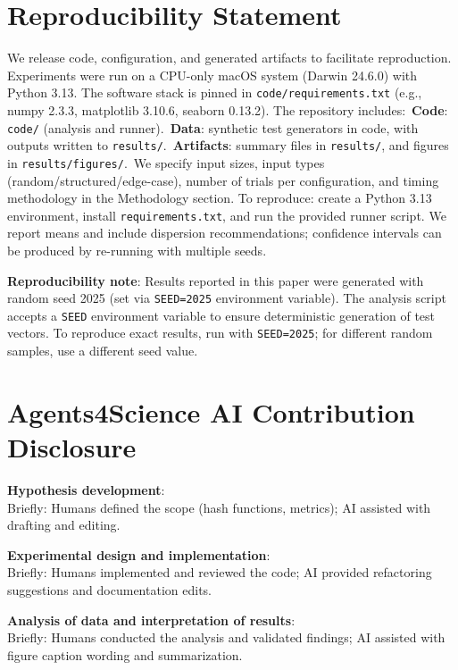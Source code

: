 \section*{Reproducibility Statement}
We release code, configuration, and generated artifacts to facilitate reproduction. Experiments were run on a CPU-only macOS system (Darwin 24.6.0) with Python 3.13. The software stack is pinned in \texttt{code/requirements.txt} (e.g., numpy 2.3.3, matplotlib 3.10.6, seaborn 0.13.2). The repository includes:\
\noindent\textbf{Code}: \texttt{code/} (analysis and runner).\
\noindent\textbf{Data}: synthetic test generators in code, with outputs written to \texttt{results/}.\
\noindent\textbf{Artifacts}: summary files in \texttt{results/}, and figures in \texttt{results/figures/}.\
We specify input sizes, input types (random/structured/edge-case), number of trials per configuration, and timing methodology in the Methodology section. To reproduce: create a Python 3.13 environment, install \texttt{requirements.txt}, and run the provided runner script. We report means and include dispersion recommendations; confidence intervals can be produced by re-running with multiple seeds.

\textbf{Reproducibility note}: Results reported in this paper were generated with random seed 2025 (set via \texttt{SEED=2025} environment variable). The analysis script accepts a \texttt{SEED} environment variable to ensure deterministic generation of test vectors. To reproduce exact results, run with \texttt{SEED=2025}; for different random samples, use a different seed value.

\section*{Agents4Science AI Contribution Disclosure}
\textbf{Hypothesis development}: \involvementB{}\\
Briefly: Humans defined the scope (hash functions, metrics); AI assisted with drafting and editing.

\textbf{Experimental design and implementation}: \involvementB{}\\
Briefly: Humans implemented and reviewed the code; AI provided refactoring suggestions and documentation edits.

\textbf{Analysis of data and interpretation of results}: \involvementB{}\\
Briefly: Humans conducted the analysis and validated findings; AI assisted with figure caption wording and summarization.

